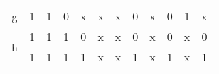 \begin{table}[H]
\begin{tabular}{c c c c c c c c c c c c}
    g  & 1 & 1 & 0 & x & x
       & x & 0 %
       & x & 0 %
       & 1 & x %
       \\
    \cmidrule(r){1-6}      \cmidrule(l){7-8} \cmidrule(l){9-10} \cmidrule(l){11-12}
    \multirow{2}{*}{h}
       & 1 & 1 & 1 & 0 & x
       & x & 0 %
       & x & 0 %
       & x & 0 %
       \\
    \cmidrule(r){2-6}      \cmidrule(l){7-8} \cmidrule(l){9-10} \cmidrule(l){11-12}
       & 1 & 1 & 1 & 1 & x
       & x & 1 %
       & x & 1 %
       & x & 1 %
       \\
    \bottomrule
  \end{tabular}
\end{table}





